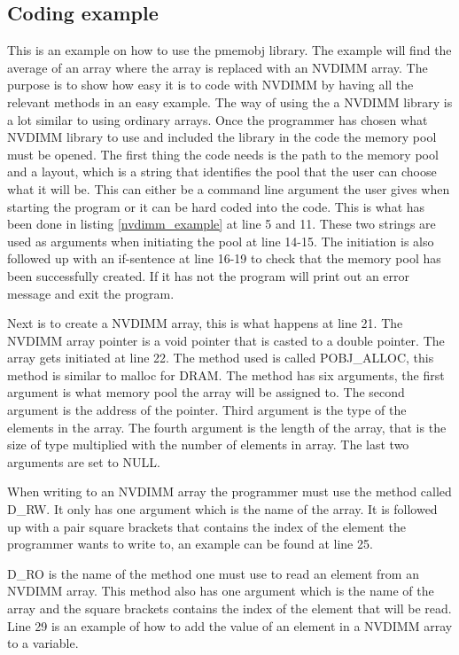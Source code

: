 \documentclass[12pt,a4paper,USenglish]{article}      %
\begin{document}
\subsection{Coding example}
This is an example on how to use the pmemobj library. The example will find the average of an array where the array is replaced with an NVDIMM array. The purpose is to show how easy it is to code with NVDIMM by having all the relevant methods in an easy example.
The way of using the a NVDIMM library is a lot similar to using ordinary arrays. Once the programmer has chosen what NVDIMM library to use and included the library in the code the memory pool must be opened. The first thing the code needs is the path to the memory pool and a layout, which is a string that identifies the pool that the user can choose what it will be. This can either be a command line argument the user gives when starting the program or it can be hard coded into the code. This is what has been done in listing \ref{nvdimm_example} at line 5 and 11. These two strings are used as arguments when initiating the pool at line 14-15. The initiation is also followed up with an if-sentence at line 16-19 to check that the memory pool has been successfully created. If it has not the program will print out an error message and exit the program.

Next is to create a NVDIMM array, this is what happens at line 21. The NVDIMM array pointer is a void pointer that is casted to a double pointer. 
The array gets initiated at line 22. The method used is called POBJ\_ALLOC, this method is similar to malloc for DRAM. The method has six arguments, the first argument is what memory pool the array will be assigned to.
The second argument is the address of the pointer. Third argument is the type of the elements in the array. The fourth argument is the length of the array, that is the size of type multiplied with the number of elements in array. The last two arguments are set to NULL.

When writing to an NVDIMM array the programmer must use the method called D\_RW. It only has one argument which is the name of the array. It is followed up with a pair square brackets that contains the index of the element the programmer wants to write to, an example can be found at line 25.

D\_RO is the name of the method one must use to read an element from an NVDIMM array. This method also has one argument which is the name of the array and the square brackets contains the index of the element that will be read. Line 29 is an example of how to add the value of an element in a NVDIMM array to a variable.
\end{document}
